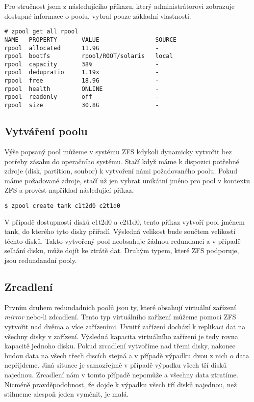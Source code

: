 Pro stručnost jsem z následujícího příkazu, který administrátorovi zobrazuje dostupné informace o poolu, vybral pouze základní vlastnosti.
\begin{verbatim}
# zpool get all rpool
NAME   PROPERTY       VALUE                SOURCE
rpool  allocated      11.9G                -
rpool  bootfs         rpool/ROOT/solaris   local
rpool  capacity       38%                  -
rpool  dedupratio     1.19x                -
rpool  free           18.9G                -
rpool  health         ONLINE               -
rpool  readonly       off                  -
rpool  size           30.8G                -
\end{verbatim}

\subsection{Vytváření poolu}
Výše popsaný pool můžeme v systému ZFS kdykoli dynamicky vytvořit bez potřeby zásahu do operačního systému. Stačí když máme k dispozici potřebné zdroje (disk, partition, soubor) k vytvoření námi požadovaného poolu. Pokud máme požadované zdroje, stačí už jen vybrat unikátní jméno pro pool v kontextu ZFS a provést například následující příkaz.
\begin{verbatim}
$ zpool create tank c1t2d0 c2t1d0
\end{verbatim}
V případě dostupnosti disků c1t2d0 a c2t1d0, tento příkaz vytvoří pool jménem tank, do kterého tyto disky přiřadí. Výsledná velikost bude součtem velikostí těchto disků. Takto vytvořený pool neobsahuje žádnou redundanci a v případě selhání disku, může dojít ke ztrátě dat. Druhým typem, které ZFS podporuje, jsou redundandní pooly.
\subsection{Zrcadlení}
Prvním druhem redundadních poolů jsou ty, které obsahují virtuální zařízení \emph{mirror} nebo-li zdcadlení. Tento typ virtuálního zařízení můžeme pomocí ZFS vytvořit nad dvěma a více zařízeními. Uvnitř zařízení dochází k replikaci dat na všechny disky v zařízení. Výsledná kapacita virtuálního zařízení je tedy rovna kapacitě jednoho disku. Pokud zrcadlení vytvoříme nad třemi disky, nakonec budou data na všech třech discích stejná a v případě výpadku dvou z nich o data nepřijdeme. Jiná situace je samozřejmě v případě výpadku všech tří disků najednou. Zrcadlení nám v tomto případě nepomůže a všechny data ztratíme. Nicméně pravděpodobnost, že dojde k výpadku všech tří disků najednou, než stihneme alespoň jeden vyměnit, je malá.

